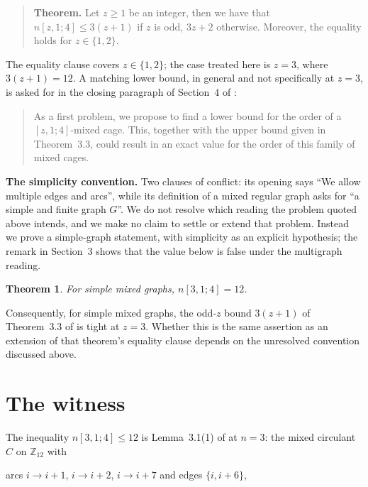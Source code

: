 \documentclass[11pt]{amsart}
\newtheorem{theorem}{Theorem}
\theoremstyle{remark}
\newcommand{\mn}[1]{n[#1]}
\begin{document}
\begin{quote}
\textbf{Theorem.} Let $z\ge1$ be an integer, then we have that
$\mn{z,1;4}\le 3(z+1)$ if $z$ is odd, $3z+2$ otherwise. Moreover, the equality
holds for $z\in\{1,2\}$.
\end{quote}

The equality clause covers $z\in\{1,2\}$; the case treated here is $z=3$, where
$3(z+1)=12$. A matching lower bound, in general and not specifically at $z=3$,
is asked for in the closing paragraph of Section~4 of \cite{AHM}:

\begin{quote}
As a first problem, we propose to find a lower bound for the order of a
$[z,1;4]$-mixed cage. This, together with the upper bound given in Theorem~3.3,
could result in an exact value for the order of this family of mixed cages.
\end{quote}

\medskip
\noindent\textbf{The simplicity convention.} Two clauses of \cite{AHM} conflict:
its opening says ``We allow multiple edges and arcs'', while its definition of a
mixed regular graph asks for ``a simple and finite graph $G$''. We do not resolve
which reading the problem quoted above intends, and we make no claim to settle
or extend that problem. Instead we prove a simple-graph statement, with
simplicity as an explicit hypothesis; the remark in Section~3 shows that the
value below is false under the multigraph reading.

\begin{theorem}\label{thm:main}
For simple mixed graphs, $\mn{3,1;4}=12$.
\end{theorem}

Consequently, for simple mixed graphs, the odd-$z$ bound $3(z+1)$ of
Theorem~3.3 of \cite{AHM} is tight at $z=3$. Whether this is the same assertion
as an extension of that theorem's equality clause depends on the unresolved
convention discussed above.

\section{The witness}

The inequality $\mn{3,1;4}\le 12$ is Lemma~3.1(1) of \cite{AHM} at $n=3$: the
mixed circulant $C$ on $\mathbb Z_{12}$ with

\begin{center}
arcs $i\to i+1$, $i\to i+2$, $i\to i+7$ \qquad and \qquad edges $\{i,i+6\}$,
\end{center}
\end{document}
